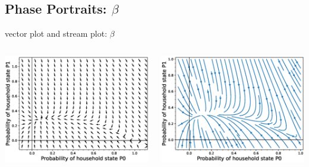 \documentclass[smaller,aspectratio=169, toc=bibliography]{beamer}
\begin{document}
\subsection*{Phase Portraits: $\beta$ }

\begin{frame}{vector plot and stream plot: $\beta$}
\begin{columns}[c]
        \begin{center}
        \includegraphics[scale=0.3]{phase_portrait/042_g16.eps}
        \caption{\(\alpha=0.4, \beta=0.5, \gamma=0.2\)} 
        \end{center}
        \begin{center}
        \includegraphics[scale=0.3]{phase_portrait/042_g16s.eps}
        \caption{\(\alpha=0.4, \beta=0.5, \gamma=0.2\)}
        \end{center}  
\end{columns}
\end{frame}
\end{document}
